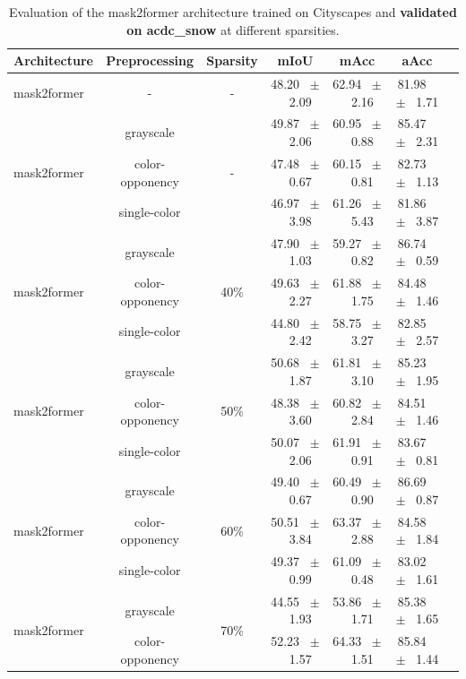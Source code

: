 \begin{table}[h]
  \centering
  \caption{Evaluation of the mask2former architecture trained on Cityscapes and \textbf{validated on acdc_snow} at different sparsities.}
  \begin{tabular}{@{}lccc ccc@{}}
    \toprule
    Architecture & Preprocessing & Sparsity & mIoU & mAcc & aAcc \\
    \midrule
    mask2former & - & - & 48.20 ~$\pm$~ 2.09 & 62.94 ~$\pm$~ 2.16 & 81.98 ~$\pm$~ 1.71 \\
    \midrule
    \midrule
    \multirow{3}{*}{mask2former} & grayscale & \multirow{3}{*}{-} & 49.87 ~$\pm$~ 2.06 & 60.95 ~$\pm$~ 0.88 & 85.47 ~$\pm$~ 2.31 \\
    & color-opponency & & 47.48 ~$\pm$~ 0.67 & 60.15 ~$\pm$~ 0.81 & 82.73 ~$\pm$~ 1.13 \\
    & single-color & & 46.97 ~$\pm$~ 3.98 & 61.26 ~$\pm$~ 5.43 & 81.86 ~$\pm$~ 3.87 \\
    \midrule
    \multirow{3}{*}{mask2former} & grayscale & \multirow{3}{*}{40\%} & 47.90 ~$\pm$~ 1.03 & 59.27 ~$\pm$~ 0.82 & 86.74 ~$\pm$~ 0.59 \\
    & color-opponency & & 49.63 ~$\pm$~ 2.27 & 61.88 ~$\pm$~ 1.75 & 84.48 ~$\pm$~ 1.46 \\
    & single-color & & 44.80 ~$\pm$~ 2.42 & 58.75 ~$\pm$~ 3.27 & 82.85 ~$\pm$~ 2.57 \\
    \midrule
    \multirow{3}{*}{mask2former} & grayscale & \multirow{3}{*}{50\%} & 50.68 ~$\pm$~ 1.87 & 61.81 ~$\pm$~ 3.10 & 85.23 ~$\pm$~ 1.95 \\
    & color-opponency & & 48.38 ~$\pm$~ 3.60 & 60.82 ~$\pm$~ 2.84 & 84.51 ~$\pm$~ 1.46 \\
    & single-color & & 50.07 ~$\pm$~ 2.06 & 61.91 ~$\pm$~ 0.91 & 83.67 ~$\pm$~ 0.81 \\
    \midrule
    \multirow{3}{*}{mask2former} & grayscale & \multirow{3}{*}{60\%} & 49.40 ~$\pm$~ 0.67 & 60.49 ~$\pm$~ 0.90 & 86.69 ~$\pm$~ 0.87 \\
    & color-opponency & & 50.51 ~$\pm$~ 3.84 & 63.37 ~$\pm$~ 2.88 & 84.58 ~$\pm$~ 1.84 \\
    & single-color & & 49.37 ~$\pm$~ 0.99 & 61.09 ~$\pm$~ 0.48 & 83.02 ~$\pm$~ 1.61 \\
    \midrule
    \multirow{3}{*}{mask2former} & grayscale & \multirow{3}{*}{70\%} & 44.55 ~$\pm$~ 1.93 & 53.86 ~$\pm$~ 1.71 & 85.38 ~$\pm$~ 1.65 \\
    & color-opponency & & 52.23 ~$\pm$~ 1.57 & 64.33 ~$\pm$~ 1.51 & 85.84 ~$\pm$~ 1.44 \\

\end{tabular}
\end{table}
